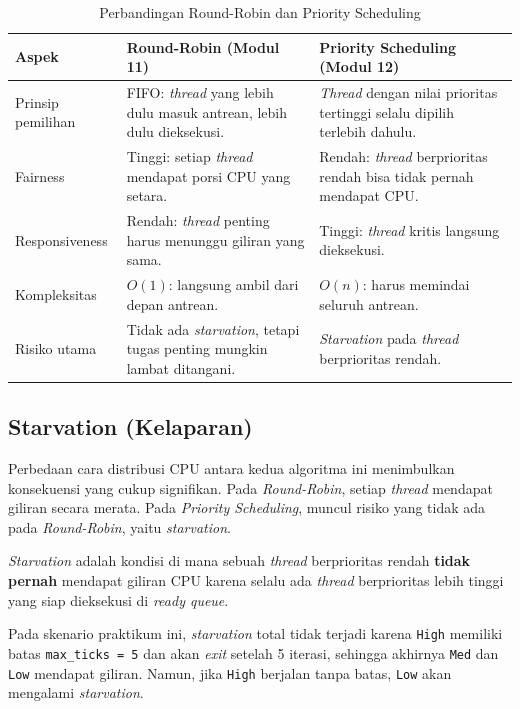 \begin{table}[htbp]
	\centering
	\caption{Perbandingan Round-Robin dan Priority Scheduling}
	\label{tab:m12-perbandingan}
	\begin{tabulary}{\textwidth}{|L|L|L|}
		\hline
		\textbf{Aspek} & \textbf{Round-Robin (Modul 11)} & \textbf{Priority Scheduling (Modul 12)} \\ \hline
		Prinsip pemilihan
		& FIFO: \textit{thread} yang lebih dulu masuk antrean, lebih dulu dieksekusi.
		& \textit{Thread} dengan nilai prioritas tertinggi selalu dipilih terlebih dahulu. \\ \hline
		Fairness
		& Tinggi: setiap \textit{thread} mendapat porsi CPU yang setara.
		& Rendah: \textit{thread} berprioritas rendah bisa tidak pernah mendapat CPU. \\ \hline
		Responsiveness
		& Rendah: \textit{thread} penting harus menunggu giliran yang sama.
		& Tinggi: \textit{thread} kritis langsung dieksekusi. \\ \hline
		Kompleksitas
		& $O(1)$: langsung ambil dari depan antrean.
		& $O(n)$: harus memindai seluruh antrean. \\ \hline
		Risiko utama
		& Tidak ada \textit{starvation}, tetapi tugas penting mungkin lambat ditangani.
		& \textit{Starvation} pada \textit{thread} berprioritas rendah. \\ \hline
	\end{tabulary}
\end{table}

\subsection{Starvation (Kelaparan)}
Perbedaan cara distribusi CPU antara kedua algoritma ini menimbulkan konsekuensi yang cukup signifikan. Pada \textit{Round-Robin}, setiap \textit{thread} mendapat giliran secara merata. Pada \textit{Priority Scheduling}, muncul risiko yang tidak ada pada \textit{Round-Robin}, yaitu \textit{starvation}.

\textit{Starvation} adalah kondisi di mana sebuah \textit{thread} berprioritas rendah \textbf{tidak pernah} mendapat giliran CPU karena selalu ada \textit{thread} berprioritas lebih tinggi yang siap dieksekusi di \textit{ready queue}.

Pada skenario praktikum ini, \textit{starvation} total tidak terjadi karena \texttt{High} memiliki batas \texttt{max\_ticks = 5} dan akan \textit{exit} setelah 5 iterasi, sehingga akhirnya \texttt{Med} dan \texttt{Low} mendapat giliran. Namun, jika \texttt{High} berjalan tanpa batas, \texttt{Low} akan mengalami \textit{starvation}.

